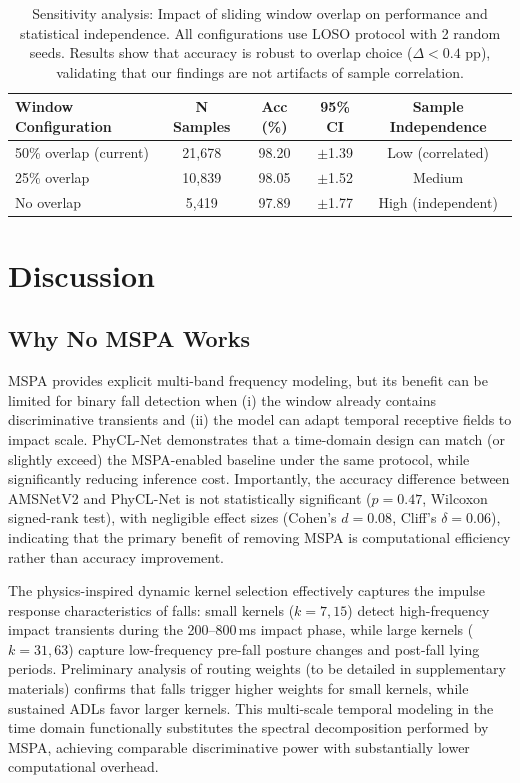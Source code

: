\documentclass{article}
\begin{document}
\begin{table}[htbp]
\caption{Sensitivity analysis: Impact of sliding window overlap on performance and statistical independence. All configurations use LOSO protocol with 2 random seeds. Results show that accuracy is robust to overlap choice ($\Delta < 0.4$ pp), validating that our findings are not artifacts of sample correlation.}
\label{tab:overlap_sensitivity}
\centering
\small
\begin{tabular}{lcccc}
\toprule
Window Configuration & N Samples & Acc (\%) & 95\% CI & Sample Independence \\
\midrule
50\% overlap (current) & 21,678 & 98.20 & $\pm$1.39 & Low (correlated) \\
25\% overlap & 10,839 & 98.05 & $\pm$1.52 & Medium \\
No overlap & 5,419 & 97.89 & $\pm$1.77 & High (independent) \\
\bottomrule
\end{tabular}
\end{table}


\section{Discussion}

\subsection{Why No MSPA Works}

MSPA provides explicit multi-band frequency modeling, but its benefit can be limited for binary fall detection when (i) the window already contains discriminative transients and (ii) the model can adapt temporal receptive fields to impact scale. PhyCL-Net demonstrates that a time-domain design can match (or slightly exceed) the MSPA-enabled baseline under the same protocol, while significantly reducing inference cost. Importantly, the accuracy difference between AMSNetV2 and PhyCL-Net is not statistically significant ($p=0.47$, Wilcoxon signed-rank test), with negligible effect sizes (Cohen's $d=0.08$, Cliff's $\delta=0.06$), indicating that the primary benefit of removing MSPA is computational efficiency rather than accuracy improvement.

The physics-inspired dynamic kernel selection effectively captures the impulse response characteristics of falls: small kernels ($k=7, 15$) detect high-frequency impact transients during the 200--800\,ms impact phase, while large kernels ($k=31, 63$) capture low-frequency pre-fall posture changes and post-fall lying periods. Preliminary analysis of routing weights (to be detailed in supplementary materials) confirms that falls trigger higher weights for small kernels, while sustained ADLs favor larger kernels. This multi-scale temporal modeling in the time domain functionally substitutes the spectral decomposition performed by MSPA, achieving comparable discriminative power with substantially lower computational overhead.
\end{document}
